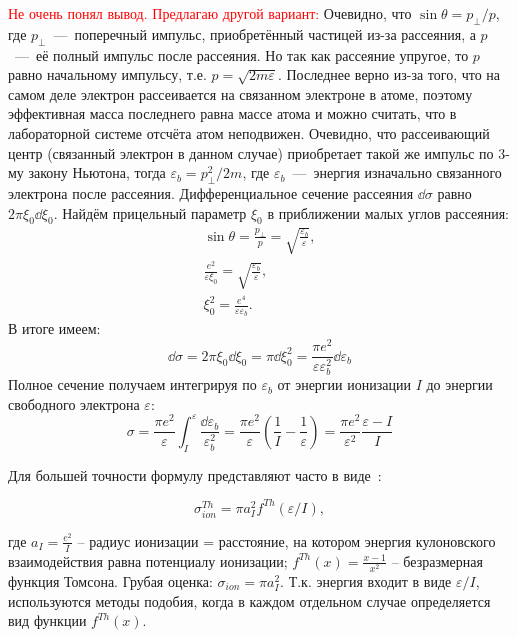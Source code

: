 \documentclass[10pt, a4paper]{article}
\numberwithin{equation}{section}
\begin{document}
\textcolor{red}{Не очень понял вывод. Предлагаю другой вариант:}
Очевидно, что $\sin\theta = p_\perp/p$, где $p_\perp$~---~поперечный импульс, приобретённый частицей из-за рассеяния, а $p$~---~её полный импульс после рассеяния. Но так как рассеяние упругое, то $p$ равно начальному импульсу, т.е. $p=\sqrt{2m\varepsilon}$. Последнее верно из-за того, что на самом деле электрон рассеивается на связанном электроне в атоме, поэтому эффективная масса последнего равна массе атома и можно считать, что в лабораторной системе отсчёта атом неподвижен. Очевидно, что рассеивающий центр (связанный электрон в данном случае) приобретает такой же импульс по 3-му закону Ньютона, тогда $\varepsilon_b=p_\perp^2/2m$, где $\varepsilon_b$~---~энергия изначально связанного электрона после рассеяния. Дифференциальное сечение рассеяния $\dd\sigma$ равно $2\pi\xi_0\dd \xi_0$. Найдём прицельный параметр $\xi_0$ в приближении малых углов рассеяния:
\begin{align*}
	\sin\theta = \frac{p_\perp}{p} = \sqrt{\frac{\varepsilon_b}{\varepsilon}} ,\\
	\frac{e^2}{\varepsilon\xi_0} = \sqrt{\frac{\varepsilon_b}{\varepsilon}} ,\\
	\xi_0^2 = \frac{e^4}{\varepsilon \varepsilon_b}.
\end{align*}
В итоге имеем:
\begin{equation*}
	\dd\sigma = 2\pi\xi_0\dd\xi_0 = \pi\dd\xi_0^2 = \frac{\pi e^2}{\varepsilon\varepsilon_b^2}\dd\varepsilon_b
\end{equation*}
Полное сечение получаем интегрируя по $\varepsilon_b$ от энергии ионизации $I$ до энергии свободного электрона $\varepsilon$:
\begin{equation}
	\sigma = \frac{\pi e^2}{\varepsilon}\int_I^\varepsilon\frac{\dd \varepsilon_b}{\varepsilon_b^2} = \frac{\pi e^2}{\varepsilon}\left( \frac{1}{I} - \frac{1}{\varepsilon} \right) = \frac{\pi e^2}{\varepsilon^2}\frac{\varepsilon - I}{I}
\end{equation}

Для большей точности формулу представляют часто в виде~\cite{astap}:

\begin{equation*}
	\sigma_{ion}^{Th} = \pi a_I^2 f^{Th}(\varepsilon/I),
\end{equation*}

где $a_I = \frac{e^2}{I}$ -- радиус ионизации = расстояние, на котором энергия кулоновского взаимодействия равна потенциалу ионизации; $f^{Th}(x) = \frac{x-1}{x^2}$ -- безразмерная функция Томсона. Грубая оценка: $\sigma_{ion} = \pi a_I^2$. Т.к. энергия входит в виде $\varepsilon/I$, используются методы подобия, когда в каждом отдельном случае определяется вид функции $f^{Th}(x)$. 
\end{document}

